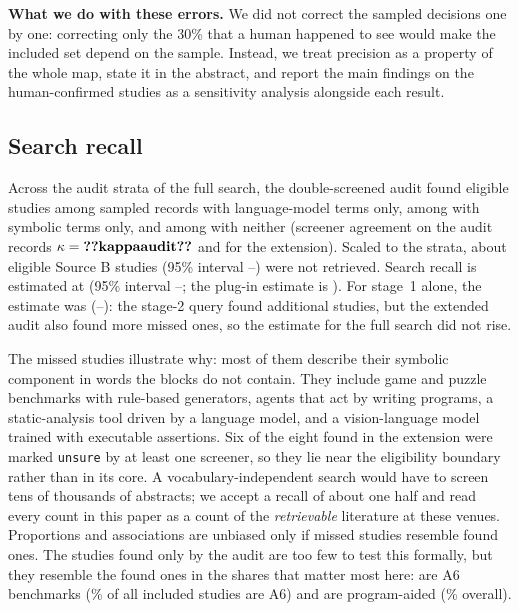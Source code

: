 \textbf{What we do with these errors.} We did not correct the sampled decisions one by one: correcting only the 30\% that a human happened to see would make the included set depend on the sample. Instead, we treat precision as a property of the whole map, state it in the abstract, and report the main findings on the human-confirmed studies as a sensitivity analysis alongside each result.
\fi

\subsection{Search recall}
\label{sec:selection-recall}
Across the audit strata of the full search, the double-screened audit found  eligible studies among  sampled records with language-model terms only,  among  with symbolic terms only, and  among  with neither (screener agreement on the audit records $\kappa=\cnt{kappaaudit}$ and  for the extension). Scaled to the strata, about  eligible Source B studies (95\% interval --) were not retrieved. Search recall is estimated at  (95\% interval --; the plug-in estimate is ). For stage~1 alone, the estimate was  (--): the stage-2 query found additional studies, but the extended audit also found more missed ones, so the estimate for the full search did not rise.

The missed studies illustrate why: most of them describe their symbolic component in words the blocks do not contain. They include game and puzzle benchmarks with rule-based generators, agents that act by writing programs, a static-analysis tool driven by a language model, and a vision-language model trained with executable assertions. Six of the eight found in the extension were marked \texttt{unsure} by at least one screener, so they lie near the eligibility boundary rather than in its core. A vocabulary-independent search would have to screen tens of thousands of abstracts; we accept a recall of about one half and read every count in this paper as a count of the \emph{retrievable} literature at these venues. Proportions and associations are unbiased only if missed studies resemble found ones. The  studies found only by the audit are too few to test this formally, but they resemble the found ones in the shares that matter most here:  are A6 benchmarks (\% of all included studies are A6) and  are program-aided (\% overall).

